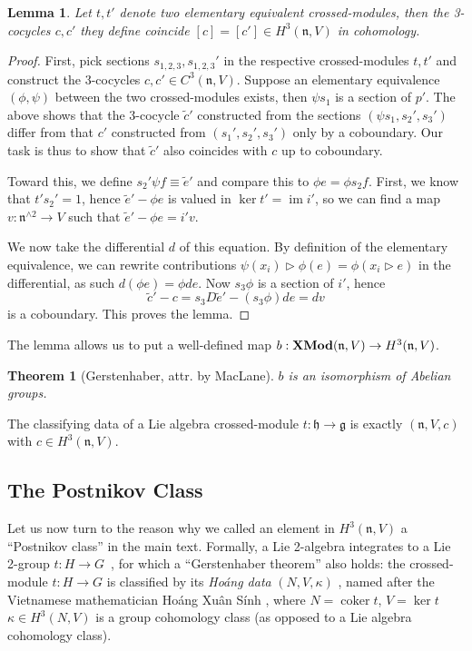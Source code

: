 \documentclass[onecolumn]{article}
\theoremstyle{theorem}
\newtheorem{theorem}{Theorem}[section]
\newtheorem{lemma}{Lemma}[section]
\theoremstyle{remark}
\theoremstyle{example}
\theoremstyle{definition}
\numberwithin{equation}{section}
\begin{document}
\begin{lemma}
Let $t,t'$ denote two elementary equivalent crossed-modules, then the 3-cocycles $c,c'$ they define coincide $[c]=[c']\in H^3(\mathfrak{n},V)$ in cohomology.
\end{lemma}
\begin{proof}
First, pick sections $s_{1,2,3},s_{1,2,3}'$ in the respective crossed-modules  $t,t'$ and construct the 3-cocycles $c,c'\in C^3(\mathfrak{n},V)$. Suppose an elementary equivalence $(\phi,\psi)$ between the two crossed-modules exists, then $\psi s_1$ is a section of $p'$. The above shows that the 3-cocycle $\tilde c'$ constructed from the sections $(\psi s_1,s_2',s_3')$ differ from that $c'$ constructed from $(s_1',s_2',s_3')$ only by a coboundary. Our task is thus to show that $\tilde c'$ also coincides with $c$ up to coboundary.

Toward this, we define $s_2'\psi f\equiv \tilde e'$ and compare this to $\phi e = \phi s_2 f$. First, we know that $t's_2'=1$, hence $\tilde e' - \phi e$ is valued in $\operatorname{ker}t'=\operatorname{im}i'$, so we can find a map $v:\mathfrak{n}^{\wedge 2}\rightarrow V$ such that $\tilde e'-\phi e = i'v$. 

We now take the differential $d$ of this equation. By definition of the elementary equivalence, we can rewrite contributions $\psi(x_i)\rhd \phi(e) = \phi(x_i\rhd e)$ in the differential, as such $d(\phi e)= \phi de$. Now $s_3\phi$ is a section of $i'$, hence 
\begin{equation}
    \tilde c' - c = s_3D \tilde e' - (s_3 \phi)de = dv\nonumber
\end{equation}
is a coboundary. This proves the lemma.
\end{proof}

The lemma allows us to put a well-defined map $b:{\bf XMod}(\mathfrak{n},V)\rightarrow H^3(\mathfrak{n},V)$. 
\begin{theorem}[Gerstenhaber, attr. by MacLane]\label{thm:gers}
 $b$ is an isomorphism of Abelian groups.
\end{theorem}

{The} %
 classifying data of a Lie algebra crossed-module $t:\mathfrak{h}\rightarrow\mathfrak{g}$ is exactly $(\mathfrak{n},V,c)$ with $c\in H^3(\mathfrak{n},V)$.

\subsection{The Postnikov Class}\label{postnikov}
Let us now turn to the reason why we called an element in $H^3(\mathfrak{n},V)$ a ``Postnikov class'' in the main text. Formally, a Lie 2-algebra integrates to a Lie 2-group $t:H\rightarrow G$~\cite{Bai_2013,Baez:2005sn}, for which a ``Gerstenhaber theorem'' also holds: the crossed-module $t: H\rightarrow G$ is classified by its {\it {Ho{\'a}ng data}} $(N,V,\kappa)$ \cite{Ang2018,Brown,baez2004}, named after the Vietnamese mathematician Ho{\'a}ng Xu{\^ a}n S{\' i}nh \cite{Baez2023HoangXS}, where $N=\operatorname{coker}t$, $V=\operatorname{ker}t$ $\kappa\in H^3(N,V)$ is a group cohomology class (as opposed to a Lie algebra cohomology class).
\end{document}
